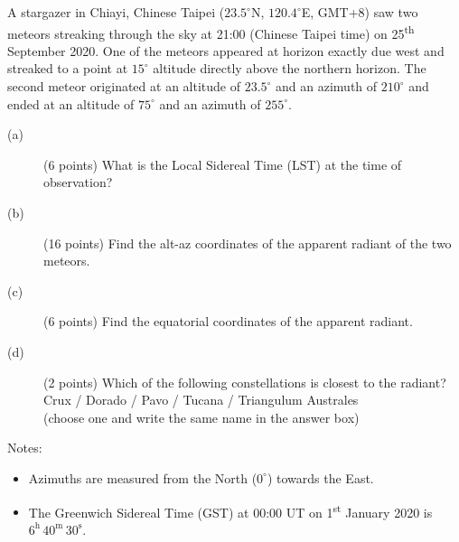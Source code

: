 A stargazer in Chiayi, Chinese Taipei ($23.5^\circ$N, $120.4^\circ$E, GMT+8)
saw two meteors streaking through the sky at 21:00 (Chinese Taipei time) on
25\textsuperscript{th} September 2020. One of the meteors appeared at horizon
exactly due west and streaked to a point at $15^\circ$ altitude directly above
the northern horizon. The second meteor originated at an altitude of
$23.5^\circ$ and an azimuth of $210^\circ$ and ended at an altitude of
$75^\circ$ and an azimuth of $255^\circ$.

\begin{description}
\item[(a)] (6 points) What is the Local Sidereal Time (LST) at the time of
  observation?
\item[(b)] (16 points) Find the alt-az coordinates of the apparent radiant of
  the two meteors.
\item[(c)] (6 points) Find the equatorial coordinates of the apparent radiant.
\item[(d)] (2 points) Which of the following constellations is closest to the
  radiant?\\
  Crux / Dorado / Pavo / Tucana / Triangulum Australes\\
  (choose one and write the same name in the answer box)
\end{description}

Notes:
\begin{itemize}
\item Azimuths are measured from the North ($0^\circ$) towards the East.
\item The Greenwich Sidereal Time (GST) at 00:00 UT on 1\textsuperscript{st}
  January 2020 is $6^{\mathrm{h}}\,40^{\mathrm{m}}\,30^{\mathrm{s}}$.
\end{itemize}
